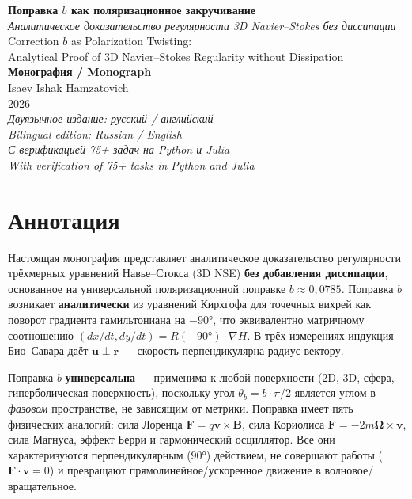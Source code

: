 \documentclass[11pt,a4paper,twoside]{article}
\theoremstyle{remark}
\begin{document}
\begin{titlepage}
\centering
\vspace*{2cm}

{\Huge\color{accent}\textbf{Поправка \texorpdfstring{$b$}{b} как поляризационное закручивание}}\\[0.5cm]

{\Large\color{accent!80!black}\textit{Аналитическое доказательство регулярности 3D Navier--Stokes без диссипации}}\\[2cm]

{\large\color{accent}Correction $b$ as Polarization Twisting:\\
Analytical Proof of 3D Navier--Stokes Regularity without Dissipation}\\[3cm]

{\large\textbf{Монография / Monograph}}\\[1cm]

{\large Isaev Ishak Hamzatovich}\\[0.3cm]
{\large 2026}\\[2cm]

{\small\itshape Двуязычное издание: русский / английский\\
Bilingual edition: Russian / English}\\[1cm]

{\small\itshape С верификацией 75+ задач на Python и Julia\\
With verification of 75+ tasks in Python and Julia}

\end{titlepage}

\section*{Аннотация}

Настоящая монография представляет аналитическое доказательство регулярности трёхмерных уравнений Навье--Стокса (3D NSE) \textbf{без добавления диссипации}, основанное на универсальной поляризационной поправке $b \approx 0{,}0785$. Поправка $b$ возникает \textbf{аналитически} из уравнений Кирхгофа для точечных вихрей как поворот градиента гамильтониана на $-90°$, что эквивалентно матричному соотношению $(dx/dt, dy/dt) = R(-90°)\cdot\nabla H$. В трёх измерениях индукция Био--Савара даёт $\mathbf{u}\perp\mathbf{r}$ --- скорость перпендикулярна радиус-вектору.

Поправка $b$ \textbf{универсальна} --- применима к любой поверхности (2D, 3D, сфера, гиперболическая поверхность), поскольку угол $\theta_b = b\cdot\pi/2$ является углом в \emph{фазовом} пространстве, не зависящим от метрики. Поправка имеет пять физических аналогий: сила Лоренца $\mathbf{F} = q\mathbf{v}\times\mathbf{B}$, сила Кориолиса $\mathbf{F} = -2m\boldsymbol{\Omega}\times\mathbf{v}$, сила Магнуса, эффект Берри и гармонический осциллятор. Все они характеризуются перпендикулярным ($90°$) действием, не совершают работы ($\mathbf{F}\cdot\mathbf{v} = 0$) и превращают прямолинейное/ускоренное движение в волновое/вращательное.
\end{document}
